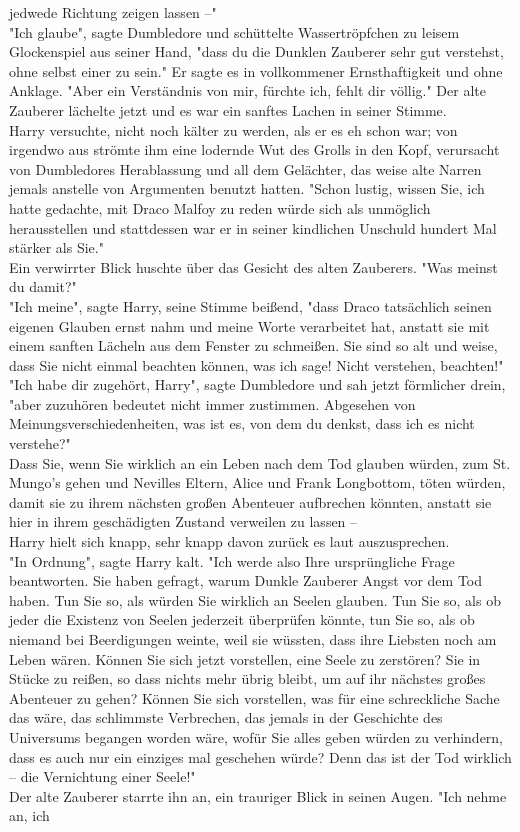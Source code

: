 {jedwede Richtung zeigen lassen --"\\ "Ich glaube", sagte Dumbledore und schüttelte Wassertröpfchen zu leisem Glockenspiel aus seiner Hand, "dass du die Dunklen Zauberer sehr gut verstehst, ohne selbst einer zu sein." Er sagte es in vollkommener Ernsthaftigkeit und ohne Anklage. "Aber ein Verständnis von mir, fürchte ich, fehlt dir völlig." Der alte Zauberer lächelte jetzt und es war ein sanftes Lachen in seiner Stimme.\\ Harry versuchte, nicht noch kälter zu werden, als er es eh schon war; von irgendwo aus strömte ihm eine lodernde Wut des Grolls in den Kopf, verursacht von Dumbledores Herablassung und all dem Gelächter, das weise alte Narren jemals anstelle von Argumenten benutzt hatten. "Schon lustig, wissen Sie, ich hatte gedachte, mit Draco Malfoy zu reden würde sich als unmöglich herausstellen und stattdessen war er in seiner kindlichen Unschuld hundert Mal stärker als Sie."\\ Ein verwirrter Blick huschte über das Gesicht des alten Zauberers. "Was meinst du damit?"\\ "Ich meine", sagte Harry, seine Stimme beißend, "dass Draco tatsächlich seinen eigenen Glauben ernst nahm und meine Worte verarbeitet hat, anstatt sie mit einem sanften Lächeln aus dem Fenster zu schmeißen. Sie sind so alt und weise, dass Sie nicht einmal beachten können, was ich sage! Nicht verstehen, beachten!"\\ "Ich habe dir zugehört, Harry", sagte Dumbledore und sah jetzt förmlicher drein, "aber zuzuhören bedeutet nicht immer zustimmen. Abgesehen von Meinungsverschiedenheiten, was ist es, von dem du denkst, dass ich es nicht verstehe?"\\ Dass Sie, wenn Sie wirklich an ein Leben nach dem Tod glauben würden, zum St. Mungo's gehen und Nevilles Eltern, Alice und Frank Longbottom, töten würden, damit sie zu ihrem nächsten großen Abenteuer aufbrechen könnten, anstatt sie hier in ihrem geschädigten Zustand verweilen zu lassen --\\ Harry hielt sich knapp, sehr knapp davon zurück es laut auszusprechen.\\ "In Ordnung", sagte Harry kalt. "Ich werde also Ihre ursprüngliche Frage beantworten. Sie haben gefragt, warum Dunkle Zauberer Angst vor dem Tod haben. Tun Sie so, als würden Sie wirklich an Seelen glauben. Tun Sie so, als ob jeder die Existenz von Seelen jederzeit überprüfen könnte, tun Sie so, als ob niemand bei Beerdigungen weinte, weil sie wüssten, dass ihre Liebsten noch am Leben wären. Können Sie sich jetzt vorstellen, eine Seele zu zerstören? Sie in Stücke zu reißen, so dass nichts mehr übrig bleibt, um auf ihr nächstes großes Abenteuer zu gehen? Können Sie sich vorstellen, was für eine schreckliche Sache das wäre, das schlimmste Verbrechen, das jemals in der Geschichte des Universums begangen worden wäre, wofür Sie alles geben würden zu verhindern, dass es auch nur ein einziges mal geschehen würde? Denn das ist der Tod wirklich -- die Vernichtung einer Seele!"\\ Der alte Zauberer starrte ihn an, ein trauriger Blick in seinen Augen. "Ich nehme an, ich }
